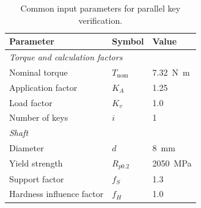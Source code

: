 \documentclass[11pt,a4paper,twoside,openright]{book}
\begin{document}
\begin{table}[htbp]
    \centering
    \begin{tabular}{l l l}
        \hline
        \textbf{Parameter} & \textbf{Symbol} & \textbf{Value} \\
        \hline
        \multicolumn{3}{l}{\textit{Torque and calculation factors}} \\
        Nominal torque          & $T_{\text{nom}}$  & \SI{7.32}{\newton\metre} \\
        Application factor & $K_A$  & 1.25 \\
        Load factor             & $K_v$             & 1.0 \\
        Number of keys          & $i$               & 1 \\
        \hline
        \multicolumn{3}{l}{\textit{Shaft~\cite{CNCMachiningTool}}} \\
        Diameter                & $d$               & \SI{8}{\milli\metre} \\
        Yield strength          & $R_{p0.2}$        & \SI{2050}{\mega\pascal} \\
        Support factor          & $f_S$             & 1.3 \\
        Hardness influence factor & $f_H$           & 1.0 \\
        \hline
    \end{tabular}
    \caption{Common input parameters for parallel key verification.}
    \label{tab:key_input_common}
\end{table}
 
\end{document}
